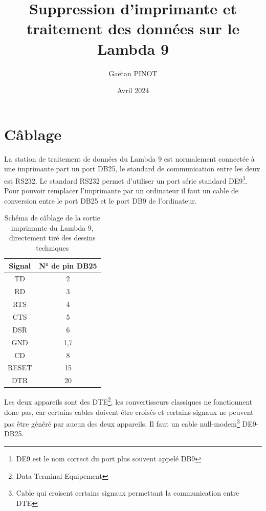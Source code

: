 \documentclass[a4paper, 12pt]{article}
\title{\Large\textbf{Suppression d'imprimante et traitement des données sur le Lambda 9}}
\author{Gaëtan PINOT}
\date{Avril 2024}
\begin{document}
\maketitle

\newpage


\section{Câblage}\label{cablage}


La station de traitement de données du Lambda 9 est normalement connectée à une imprimante part un port DB25, le standard de communication entre les deux est RS232.
Le standard RS232 permet d'utiliser un port série standard DE9\footnote{DE9 est le nom correct du port plus souvent appelé DB9 %
}.
Pour pouvoir remplacer l'imprimante par un ordinateur il faut un cable de conversion entre le port DB25 et le port DB9 de l'ordinateur.


\begin{table}[htb]
	\begin{tabular}{|c|c|}
		\hline
		Signal & N° de pin DB25 \\ \hline
		TD     & 2              \\ \hline
		RD     & 3              \\ \hline
		RTS    & 4              \\ \hline
		CTS    & 5              \\ \hline
		DSR    & 6              \\ \hline
		GND    & 1,7            \\ \hline
		CD     & 8              \\ \hline
		RESET  & 15             \\ \hline
		DTR    & 20             \\ \hline
	\end{tabular}
	\centering
	\caption{Schéma de câblage de la sortie imprimante du Lambda 9, directement tiré des dessins techniques}
	\label{table:pinoutLambda}
\end{table}

Les deux appareils sont des DTE\footnote{Data Terminal Equipement}, les convertisseurs classiques ne fonctionnent donc pas, car certains cables doivent être croisés et certains signaux ne peuvent pas être généré par aucun des deux appareils.
Il faut un cable null-modem\footnote{Cable qui croisent certains signaux permettant la communication entre DTE} DE9-DB25.
\end{document}
